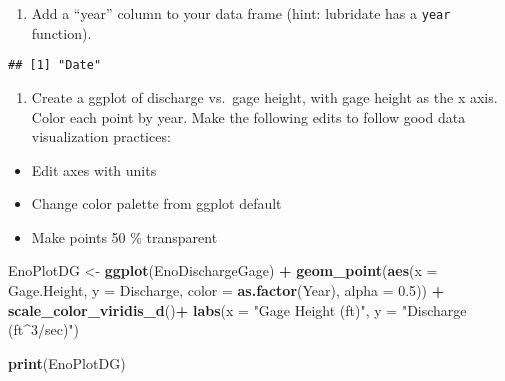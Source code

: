 \documentclass[]{article}
\newenvironment{Shaded}{\begin{snugshade}}{\end{snugshade}}
\newcommand{\DataTypeTok}[1]{\textcolor[rgb]{0.13,0.29,0.53}{#1}}
\newcommand{\FloatTok}[1]{\textcolor[rgb]{0.00,0.00,0.81}{#1}}
\newcommand{\KeywordTok}[1]{\textcolor[rgb]{0.13,0.29,0.53}{\textbf{#1}}}
\newcommand{\NormalTok}[1]{#1}
\newcommand{\OperatorTok}[1]{\textcolor[rgb]{0.81,0.36,0.00}{\textbf{#1}}}
\newcommand{\StringTok}[1]{\textcolor[rgb]{0.31,0.60,0.02}{#1}}
\providecommand{\tightlist}{%
  \setlength{\itemsep}{0pt}\setlength{\parskip}{0pt}}
\begin{document}
\begin{enumerate}
\def\labelenumi{\arabic{enumi}.}
\setcounter{enumi}{7}
\tightlist
\item
  Add a ``year'' column to your data frame (hint: lubridate has a
  \texttt{year} function).
\end{enumerate}

\begin{Shaded}
\end{Shaded}

\begin{verbatim}
## [1] "Date"
\end{verbatim}

\begin{Shaded}
\end{Shaded}

\begin{enumerate}
\def\labelenumi{\arabic{enumi}.}
\setcounter{enumi}{8}
\tightlist
\item
  Create a ggplot of discharge vs.~gage height, with gage height as the
  x axis. Color each point by year. Make the following edits to follow
  good data visualization practices:
\end{enumerate}

\begin{itemize}
\tightlist
\item
  Edit axes with units
\item
  Change color palette from ggplot default
\item
  Make points 50 \% transparent
\end{itemize}

\begin{Shaded}
\begin{Highlighting}[]
\NormalTok{EnoPlotDG <-}\StringTok{ }\KeywordTok{ggplot}\NormalTok{(EnoDischargeGage) }\OperatorTok{+}
\StringTok{  }\KeywordTok{geom_point}\NormalTok{(}\KeywordTok{aes}\NormalTok{(}\DataTypeTok{x =}\NormalTok{ Gage.Height, }\DataTypeTok{y =}\NormalTok{ Discharge, }
                 \DataTypeTok{color =} \KeywordTok{as.factor}\NormalTok{(Year), }\DataTypeTok{alpha =} \FloatTok{0.5}\NormalTok{)) }\OperatorTok{+}
\StringTok{  }\KeywordTok{scale_color_viridis_d}\NormalTok{()}\OperatorTok{+}
\StringTok{  }\KeywordTok{labs}\NormalTok{(}\DataTypeTok{x =} \StringTok{"Gage Height (ft)"}\NormalTok{, }\DataTypeTok{y =} \StringTok{"Discharge (ft^3/sec)"}\NormalTok{)}

\KeywordTok{print}\NormalTok{(EnoPlotDG)}
\end{Highlighting}
\end{Shaded}
\end{document}
